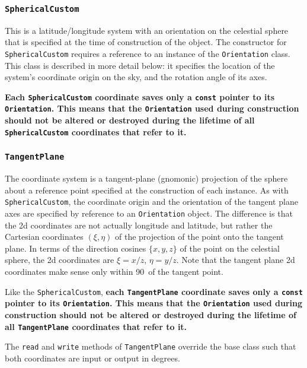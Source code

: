 \documentclass[11pt,preprint,flushrt]{aastex}
\begin{document}
\subsubsection{\tt SphericalCustom}
This is a latitude/longitude system with an orientation on the celestial sphere that is specified at the time of construction of the object.  The constructor for {\tt SphericalCustom} requires a reference to an instance of the {\tt Orientation} class.  This class is described in more detail below: it specifies the location of the system's coordinate origin on the sky, and the rotation angle of its axes.  

{\bf Each {\tt SphericalCustom} coordinate saves only a {\tt const} pointer to its {\tt Orientation}.  This means that the {\tt Orientation} used during construction should not be altered or destroyed during the lifetime of all {\tt SphericalCustom} coordinates that refer to it.}

\subsubsection{\tt TangentPlane}
The coordinate system is a tangent-plane (gnomonic) projection of the sphere about a reference point specified at the construction of each instance.  As with {\tt SphericalCustom}, the coordinate origin and the orientation of the tangent plane axes are specified by reference to an {\tt Orientation} object.   The difference is that the 2d coordinates are not actually longitude and latitude, but rather the Cartesian coordinates $(\xi,\eta)$ of the projection of the point onto the tangent plane.  In terms of the direction cosines $\{x,y,z\}$ of the point on the celestial sphere, the 2d coordinates are $\xi=x/z$, $\eta=y/z$.  Note that the tangent plane 2d coordinates make sense only within 90\arcdeg\ of the tangent point.

Like the {\tt SphericalCustom}, 
{\bf each {\tt TangentPlane} coordinate saves only a {\tt const} pointer to its {\tt Orientation}.  This means that the {\tt Orientation} used during construction should not be altered or destroyed during the lifetime of all {\tt TangentPlane} coordinates that refer to it.}

The {\tt read} and {\tt write} methods of {\tt TangentPlane} override the base class such that both coordinates are input or output in degrees.
\end{document}
